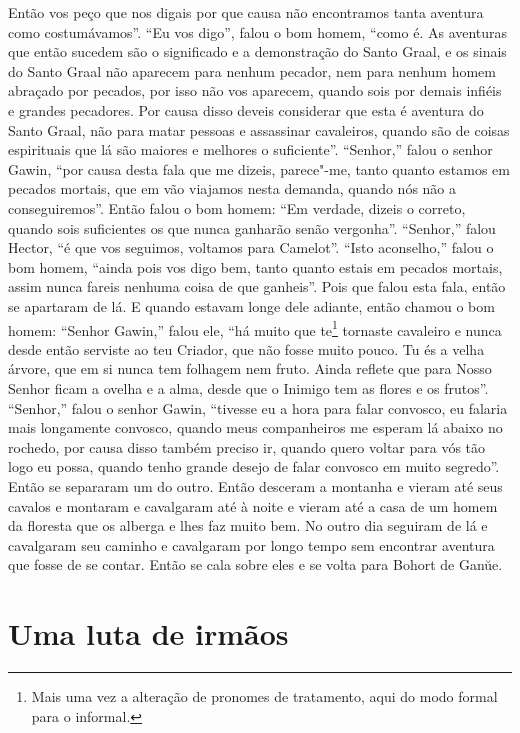 Então vos peço que nos digais por que causa não encontramos tanta aventura como
costumávamos”. “Eu vos digo”, falou o bom homem, “como é. As aventuras que então
sucedem são o significado e a demonstração do Santo Graal, e os sinais do Santo
Graal não aparecem para nenhum pecador, nem para nenhum homem abraçado por
pecados, por isso não vos aparecem, quando sois por demais infiéis e grandes
pecadores. Por causa disso deveis considerar que esta é aventura do Santo
Graal, não para matar pessoas e assassinar cavaleiros, quando são de coisas
espirituais que lá são maiores e melhores o suficiente”. “Senhor,”
falou o senhor Gawin, “por causa desta fala que me dizeis, parece"-me, tanto
quanto estamos em pecados mortais, que em vão viajamos nesta demanda, quando
nós não a conseguiremos”. Então falou o bom homem: “Em verdade, dizeis o
correto, quando sois suficientes os que nunca ganharão senão vergonha”.
“Senhor,” falou Hector, “é que vos seguimos, voltamos para Camelot”. “Isto
aconselho,” falou o bom homem, “ainda pois vos digo bem,  tanto quanto estais
em pecados mortais, assim nunca fareis nenhuma coisa de que ganheis”. Pois que
falou esta fala, então se apartaram de lá. E quando estavam longe dele adiante,
então chamou o bom homem: “Senhor Gawin,” falou ele, “há muito que te\footnote{
Mais uma vez a alteração de pronomes de tratamento, aqui do modo formal para o
informal.}  tornaste cavaleiro e nunca desde então serviste ao teu
Criador, que não fosse muito pouco. Tu és a velha árvore, que em si nunca tem
folhagem nem fruto. Ainda reflete que para Nosso Senhor ficam a ovelha e a
alma, desde que o Inimigo tem as flores e os frutos”. “Senhor,” falou
o senhor Gawin, “tivesse eu a hora para falar convosco, eu falaria mais
longamente convosco, quando meus companheiros me esperam lá abaixo no rochedo,
por causa disso também preciso ir, quando quero voltar para vós tão logo eu
possa, quando tenho grande desejo de falar convosco em muito segredo”. Então se
separaram um do outro. Então desceram a montanha e vieram até seus cavalos e
montaram e cavalgaram até à noite e vieram até a casa de um homem da floresta
que os alberga e lhes faz muito bem. No outro dia seguiram de lá e cavalgaram
seu caminho e cavalgaram por longo tempo sem encontrar aventura que fosse de se
contar. Então se cala sobre eles e se volta para Bohort de Gan\u{u}e. 

\chapter{Uma luta de irmãos}


